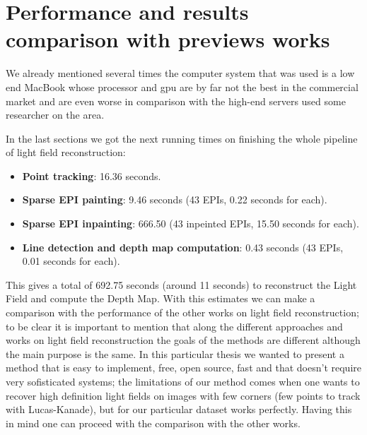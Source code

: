 \section{Performance and results comparison with previews works}
\label{sec:perform_results}

We already mentioned several times the computer system that was used is a low end MacBook whose processor and gpu are by far not the best in the commercial market and are even worse in comparison with the high-end servers used some researcher on the area. 

\bigskip

In the last sections we got the next running times on finishing the whole pipeline of light field reconstruction:

\begin{itemize}
\item \textbf{Point tracking}: 16.36 seconds.
\item \textbf{Sparse EPI painting}: 9.46 seconds (43 EPIs, 0.22 seconds for each).
\item \textbf{Sparse EPI inpainting}: 666.50 (43 inpeinted EPIs, 15.50 seconds for each).
\item \textbf{Line detection and depth map computation}: 0.43 seconds (43 EPIs, 0.01 seconds for each).
\end{itemize}

This gives a total of 692.75 seconds (around 11 seconds) to reconstruct the Light Field and compute the Depth Map. With this estimates we can make a comparison with the performance of the other works on light field reconstruction; to be clear it is important to mention that along the different approaches and works on light field reconstruction the goals of the methods are different although the main purpose is the same. In this particular thesis we wanted to present a method that is easy to implement, free, open source, fast and that doesn't require very sofisticated systems; the limitations of our method comes when one wants to recover high definition light fields on images with few corners (few points to track with Lucas-Kanade), but for our particular dataset works perfectly. Having this in mind one can proceed with the comparison with the other works.

